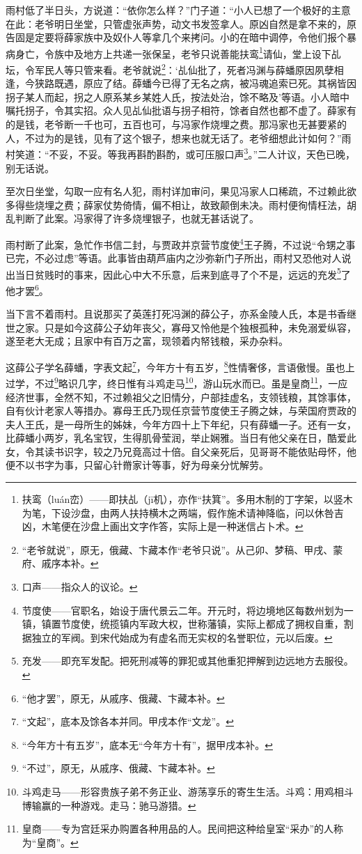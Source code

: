 \par 雨村低了半日头，方说道：“依你怎么样？”门子道：“小人已想了一个极好的主意在此：老爷明日坐堂，只管虚张声势，动文书发签拿人。原凶自然是拿不来的，原告固是定要将薛家族中及奴仆人等拿几个来拷问。小的在暗中调停，令他们报个暴病身亡，令族中及地方上共递一张保呈，老爷只说善能扶鸾\footnote{扶鸾（luán峦）——即扶乩（jī机），亦作“扶箕”。多用木制的丁字架，以竖木为笔，下设沙盘，由两人扶持横木之两端，假作施术请神降临，问以休咎吉凶，木笔便在沙盘上画出文字作答，实际上是一种迷信占卜术。}请仙，堂上设下乩坛，令军民人等只管来看。老爷就说\footnote{“老爷就说”，原无，俄藏、卞藏本作“老爷只说”。从己卯、梦稿、甲戌、蒙府、戚序本补。}：‘乩仙批了，死者冯渊与薛蟠原因夙孽相逢，今狭路既遇，原应了结。薛蟠今已得了无名之病，被冯魂追索已死。其祸皆因拐子某人而起，拐之人原系某乡某姓人氏，按法处治，馀不略及’等语。小人暗中嘱托拐子，令其实招。众人见乩仙批语与拐子相符，馀者自然也都不虚了。薛家有的是钱，老爷断一千也可，五百也可，与冯家作烧埋之费。那冯家也无甚要紧的人，不过为的是钱，见有了这个银子，想来也就无话了。老爷细想此计如何？”雨村笑道：“不妥，不妥。等我再斟酌斟酌，或可压服口声\footnote{口声——指众人的议论。}。”二人计议，天色已晚，别无话说。
\par 至次日坐堂，勾取一应有名人犯，雨村详加审问，果见冯家人口稀疏，不过赖此欲多得些烧埋之费；薛家仗势倚情，偏不相让，故致颠倒未决。雨村便徇情枉法，胡乱判断了此案。冯家得了许多烧埋银子，也就无甚话说了。
\par 雨村断了此案，急忙作书信二封，与贾政并京营节度使\footnote{节度使——官职名，始设于唐代景云二年。开元时，将边境地区每数州划为一镇，镇置节度使，统揽镇内军政大权，世称藩镇，实际上都成了拥权自重，割据独立的军阀。到宋代始成为有虚名而无实权的名誉职位，元以后废。}王子腾，不过说“令甥之事已完，不必过虑”等语。此事皆由葫芦庙内之沙弥新门子所出，雨村又恐他对人说出当日贫贱时的事来，因此心中大不乐意，后来到底寻了个不是，远远的充发\footnote{充发——即充军发配。把死刑减等的罪犯或其他重犯押解到边远地方去服役。}了他才罢\footnote{“他才罢”，原无，从戚序、俄藏、卞藏本补。}。
\par 当下言不着雨村。且说那买了英莲打死冯渊的薛公子，亦系金陵人氏，本是书香继世之家。只是如今这薛公子幼年丧父，寡母又怜他是个独根孤种，未免溺爱纵容，遂至老大无成；且家中有百万之富，现领着内帑钱粮，采办杂料。
\par 这薛公子学名薛蟠，字表文起\footnote{“文起”，底本及馀各本并同。甲戌本作“文龙”。}，今年方十有五岁，\footnote{“今年方十有五岁”，底本无“今年方十有”，据甲戌本补。}性情奢侈，言语傲慢。虽也上过学，不过\footnote{“不过”，原无，从戚序、俄藏、卞藏本补。}略识几字，终日惟有斗鸡走马\footnote{斗鸡走马——形容贵族子弟不务正业、游荡享乐的寄生生活。斗鸡：用鸡相斗博输赢的一种游戏。走马：驰马游猎。}，游山玩水而已。虽是皇商\footnote{皇商——专为宫廷采办购置各种用品的人。民间把这种给皇室“采办”的人称为“皇商”。}，一应经济世事，全然不知，不过赖祖父之旧情分，户部挂虚名，支领钱粮，其馀事体，自有伙计老家人等措办。寡母王氏乃现任京营节度使王子腾之妹，与荣国府贾政的夫人王氏，是一母所生的姊妹，今年方四十上下年纪，只有薛蟠一子。还有一女，比薛蟠小两岁，乳名宝钗，生得肌骨莹润，举止娴雅。当日有他父亲在日，酷爱此女，令其读书识字，较之乃兄竟高过十倍。自父亲死后，见哥哥不能依贴母怀，他便不以书字为事，只留心针黹家计等事，好为母亲分忧解劳。
